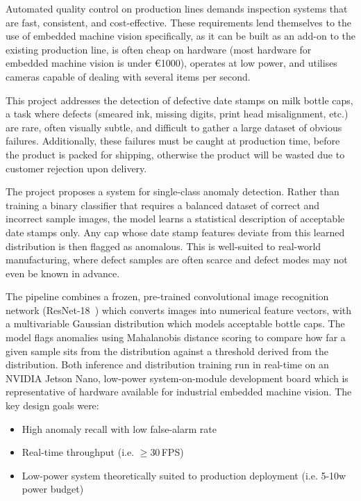 \documentclass[conference]{IEEEtran}
\begin{document}
Automated quality control on production lines demands inspection systems that are fast, consistent, and cost-effective. These requirements lend themselves to the use of embedded machine vision specifically, as it can be built as an add-on to the existing production line, is often cheap on hardware (most hardware for embedded machine vision is under €1000), operates at low power, and utilises cameras capable of dealing with several items per second.

This project addresses the detection of defective date stamps on milk bottle caps, a task where defects (smeared ink, missing digits, print head misalignment, etc.) are rare, often visually subtle, and difficult to gather a large dataset of obvious failures. Additionally, these failures must be caught at production time, before the product is packed for shipping, otherwise the product will be wasted due to customer rejection upon delivery.

The project proposes a system for single-class anomaly detection. Rather than training a binary classifier that requires a balanced dataset of correct and incorrect sample images, the model learns a statistical description of acceptable date stamps only. Any cap whose date stamp features deviate from this learned distribution is then flagged as anomalous. This is well-suited to real-world manufacturing, where defect samples are often scarce and defect modes may not even be known in advance.

The pipeline combines a frozen, pre-trained convolutional image recognition network
(ResNet-18~\cite{he2016resnet}) which converts images into numerical feature vectors, with a multivariable Gaussian distribution which models acceptable bottle caps. The model flags anomalies using Mahalanobis distance scoring to compare how far a given sample sits from the distribution against a threshold derived from the distribution. Both inference and distribution training run in real-time on an NVIDIA Jetson Nano, low-power system-on-module development board which is representative of hardware available for industrial embedded machine vision. The key design goals were:
\begin{itemize}
\item High anomaly recall with low false-alarm rate
\item Real-time throughput (i.e. $\geq$30\,FPS)
\item Low-power system theoretically suited to production deployment (i.e. 5-10w power budget)
\end{itemize}
\end{document}
